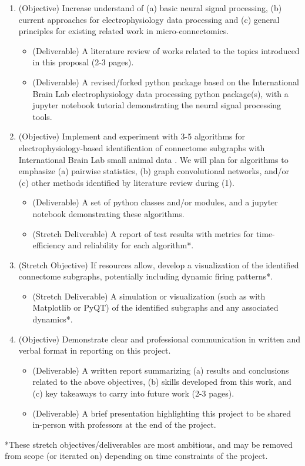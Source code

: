 \documentclass[11pt]{article}
\begin{document}
\begin{enumerate}
    \item (Objective) Increase understand of (a) basic neural signal processing, (b) current approaches for electrophysiology data processing and (c) general principles for existing related work in micro-connectomics.
    \begin{itemize}
        \item (Deliverable) A literature review of works related to the topics introduced in this proposal (2-3 pages).
        \item (Deliverable) A revised/forked python package based on the International Brain Lab electrophysiology data processing python package(s), with a jupyter notebook tutorial demonstrating the neural signal processing tools.
    \end{itemize}

    \item (Objective) Implement and experiment with 3-5 algorithms for electrophysiology-based identification of connectome subgraphs with International Brain Lab small animal data \cite{Laboratory2022, zhang2025neuralencodingdecodingscale}. We will plan for algorithms to emphasize (a) pairwise statistics, (b) graph convolutional networks, and/or (c) other methods identified by literature review during (1).
    \begin{itemize}
        \item (Deliverable) A set of python classes and/or modules, and a jupyter notebook demonstrating these algorithms.
        \item (Stretch Deliverable) A report of test results with metrics for time-efficiency and reliability for each algorithm*.
    \end{itemize}

    \item (Stretch Objective) If resources allow, develop a visualization of the identified connectome subgraphs, potentially including dynamic firing patterns*.
    \begin{itemize}
        \item (Stretch Deliverable) A simulation or visualization (such as with Matplotlib or PyQT) of the identified subgraphs and any associated dynamics*.
    \end{itemize}

    \item (Objective) Demonstrate clear and professional communication in written and verbal format in reporting on this project.
    \begin{itemize}
        \item (Deliverable) A written report summarizing (a) results and conclusions related to the above objectives, (b) skills developed from this work, and (c) key takeaways to carry into future work (2-3 pages).
        \item (Deliverable) A brief presentation highlighting this project to be shared in-person with professors at the end of the project.
    \end{itemize}
\end{enumerate}
*These stretch objectives/deliverables are most ambitious, and may be removed from scope (or iterated on) depending on time constraints of the project.
\end{document}
